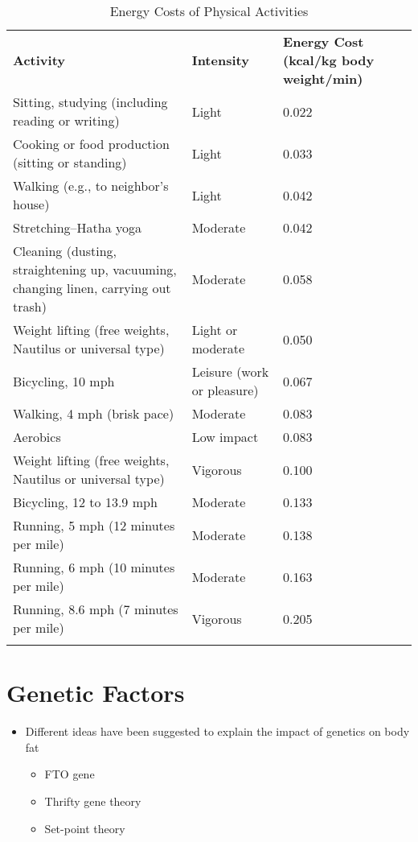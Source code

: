 \documentclass[title={Chapter 10: Achieving and Maintaining a Healthful Body Weight}]{fdsn201notes}
\begin{document}
\begin{table}[H]
	\centering
	\caption{Energy Costs of Physical Activities}
	\label{tab:energy-costs-of-physical-activities}
	\begin{tabular}{p{}p{}p{}}
		\rowcolor{rowdarkgreen}\textbf{Activity} & \textbf{Intensity} & \textbf{Energy Cost (kcal/kg body weight/min)}\\
		Sitting, studying (including reading or writing) & Light & 0.022\\
		Cooking or food production (sitting or standing) & Light & 0.033\\
		Walking (e.g., to neighbor's house) & Light & 0.042\\
		Stretching--Hatha yoga & Moderate & 0.042\\
		Cleaning (dusting, straightening up, vacuuming, changing linen, carrying out trash) & Moderate & 0.058 \\
		Weight lifting (free weights, Nautilus or universal type) & Light or moderate & 0.050\\
		Bicycling, 10 mph & Leisure (work or pleasure) & 0.067\\
		Walking, 4 mph (brisk pace) & Moderate & 0.083\\
		Aerobics & Low impact & 0.083\\
		Weight lifting (free weights, Nautilus or universal type) & Vigorous & 0.100\\
		Bicycling, 12 to 13.9 mph & Moderate & 0.133\\
		Running, 5 mph (12 minutes per mile) & Moderate & 0.138\\
		Running, 6 mph (10 minutes per mile) & Moderate & 0.163\\
		Running, 8.6 mph (7 minutes per mile) & Vigorous & 0.205\\
		\rowcolor{rowdarkgreen} & & \\
	\end{tabular}
\end{table}

\section{Genetic Factors}\label{sec:genetic-factors}
\begin{itemize}
	\item Different ideas have been suggested to explain the impact of genetics on body fat
	\begin{itemize}
		\item FTO gene
		\item Thrifty gene theory
		\item Set-point theory
	\end{itemize}
\end{itemize}
\end{document}
